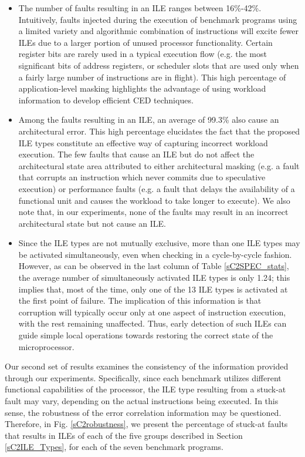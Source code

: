 \documentclass[12pt]{yalephd}
\newcommand{\snp}[1] {\noindent {\underline {#1}}}
\begin{document}
\begin{itemize}
\item The number of faults resulting in an ILE ranges between 16\%-42\%. Intuitively, faults injected during the execution of benchmark programs using a limited variety and algorithmic combination of instructions will excite fewer ILEs due to a larger portion of unused processor functionality. Certain register bits are rarely used in a typical execution flow (e.g. the most significant bits of address registers, or scheduler slots that are used only when a fairly large number of instructions are in flight). This high percentage of application-level masking highlights the advantage of using workload information to develop efficient CED techniques.

\item Among the faults resulting in an ILE, an average of 99.3\% also cause an architectural error. This high percentage elucidates the fact that the proposed ILE types constitute an effective way of capturing incorrect workload execution. The few faults that cause an ILE but do not affect the architectural state area attributed to either architectural masking (e.g. a fault that corrupts an instruction which never commits due to speculative execution) or performance faults (e.g. a fault that delays the availability of a functional unit and causes the workload to take longer to execute). We also note that, in our experiments, none of the faults may result in an incorrect architectural state but not cause an ILE.

\item Since the ILE types are not mutually exclusive, more than one ILE types may be activated simultaneously, even when checking in a cycle-by-cycle fashion. However, as can be observed in the last column of Table \ref{sC2SPEC_stats}, the average number of simultaneously activated ILE types is only 1.24; this implies that, most of the time, only one of the 13 ILE types is activated at the first point of failure. The implication of this information is that corruption will typically occur only at one aspect of instruction execution, with the rest remaining unaffected. Thus, early detection of such ILEs can guide simple local operations towards restoring the correct state of the microprocessor.
\end{itemize}

\snp{Benchmark Consistency:} Our second set of results examines the consistency of the information provided through our experiments. Specifically, since each benchmark utilizes different functional capabilities of the processor, the ILE type resulting from a stuck-at fault may vary, depending on the actual instructions being executed. In this sense, the robustness of the error correlation information may be questioned. Therefore, in Fig. \ref{sC2robustness}, we present the percentage of stuck-at faults that results in ILEs of each of the five groups described in Section \ref{sC2ILE_Types}, for each of the seven benchmark programs. 
\end{document}
